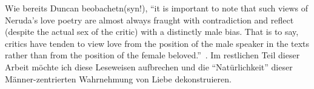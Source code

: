 Wie bereits Duncan beobachetn(syn!), ``it is important to note that such views of Neruda's love poetry are almost always fraught with contradiction and reflect (despite the actual sex of the critic) with a distinctly male bias.
That is to say, critics have tenden to view love from the position of the male speaker in the texts rather than from the position of the female beloved.''~\cite{Duncan1992}.
Im restlichen Teil dieser Arbeit möchte ich diese Leseweisen aufbrechen und die ``Natürlichkeit'' dieser Männer-zentrierten Wahrnehmung von Liebe dekonstruieren.


